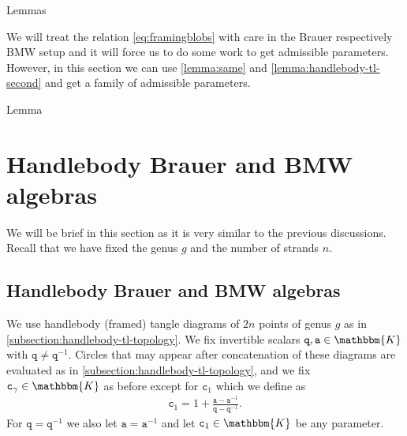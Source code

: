 \documentclass[a4paper,11pt]{amsart}
\newcommand{\KK}{\mathbbm{K}}
\newcommand{\varsym}[1]{\mathtt{#1}}
\newcommand{\qvar}{\varsym{q}}
\newcommand{\cvar}{\varsym{c}}
\newcommand{\avar}{\varsym{a}}
\numberwithin{equation}{section}
\let\fullref\autoref
\def\makeautorefname#1#2{\expandafter\def\csname#1autorefname\endcsname{#2}}
\begin{document}
\makeautorefname{lemma}{Lemmas}

\begin{remark}
We will treat the relation \eqref{eq:framingblobs} 
with care in the Brauer respectively BMW setup 
and it will force us to do 
some work to get admissible parameters. However, in this section 
we can use \fullref{lemma:same} and \ref{lemma:handlebody-tl-second} 
and get a family of admissible parameters.
\end{remark}

\makeautorefname{lemma}{Lemma}

\section{Handlebody Brauer and BMW algebras}\label{section:brauer}

We will be brief in this section as it is very similar 
to the previous discussions. Recall that we have fixed the genus $g$ and 
the number of strands $n$.

\subsection{Handlebody Brauer and BMW algebras}\label{subsection:BMW}

We use handlebody 
(framed) tangle diagrams of $2n$ 
points of genus $g$ as in \fullref{subsection:handlebody-tl-topology}.
We fix invertible scalars 
$\qvar,\avar\in\KK$ with $\qvar\neq\qvar^{-1}$.
Circles that may appear after concatenation of these diagrams 
are evaluated as in \fullref{subsection:handlebody-tl-topology}, and we 
fix $\cvar_{\gamma}\in\KK$ as before except for 
$\cvar_{1}$ which we define as
\begin{gather*}
\cvar_{1}=1+\frac{\avar-\avar^{-1}}{\qvar-\qvar^{-1}}.
\end{gather*}
For $\qvar=\qvar^{-1}$ we also let $\avar=\avar^{-1}$
and let $\cvar_{1}\in\KK$ be any parameter.
\end{document}
